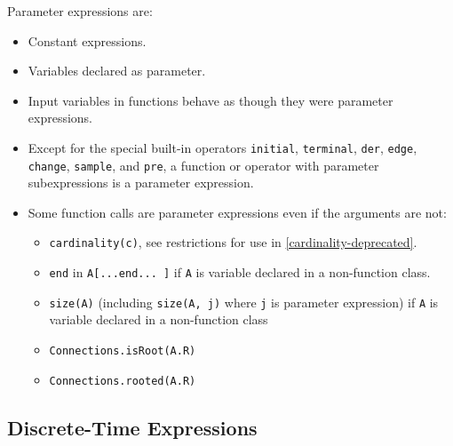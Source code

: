 Parameter expressions are:
\begin{itemize}
\item
  Constant expressions.
\item
  Variables declared as parameter.
\item
  Input variables in functions behave as though they were parameter expressions.
\item
  Except for the special built-in operators \lstinline!initial!, \lstinline!terminal!, \lstinline!der!,
  \lstinline!edge!, \lstinline!change!, \lstinline!sample!, and \lstinline!pre!, a function or operator with parameter
  subexpressions is a parameter expression.
\item
  Some function calls are parameter expressions even if the arguments
  are not:

  \begin{itemize}
  \item
    \lstinline!cardinality(c)!, see restrictions for use in \autoref{cardinality-deprecated}.
  \item
    \lstinline!end! in \lstinline!A[...end... ]! if \lstinline!A! is variable declared in a  non-function class.
  \item
    \lstinline!size(A)! (including \lstinline!size(A, j)! where \lstinline!j! is parameter expression) if \lstinline!A!
    is variable declared in a non-function class
  \item
    \lstinline!Connections.isRoot(A.R)!
  \item
    \lstinline!Connections.rooted(A.R)!
  \end{itemize}
\end{itemize}

\subsection{Discrete-Time Expressions}

